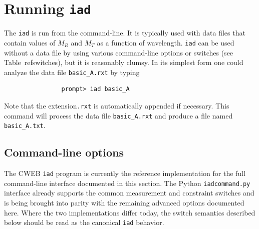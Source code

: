 \documentclass{article}
\newcommand\iadprog{\texttt{iad}}
\begin{document}
\clearpage
\section{Running \iadprog{}}

The \iadprog{} is run from the command-line.  It is typically used with
data files that contain values of $M_R$ and $M_T$ as a function of wavelength.
\iadprog{} can be used without a data file by using various command-line 
options or switches (see Table~ref{switches}), but it is reasonably clumsy.  
In its simplest form 
one could analyze the data file \texttt{basic\_A.rxt} by typing
\begin{verbatim}
                prompt> iad basic_A
\end{verbatim}
Note that the extension\texttt{.rxt} is automatically appended if necessary.
This command will process the data file \texttt{basic\_A.rxt} and produce a
file named \texttt{basic\_A.txt}.

\clearpage
\subsection{Command-line options}
The CWEB \texttt{iad} program is currently the reference implementation for the
full command-line interface documented in this section.  The Python
\texttt{iadcommand.py} interface already supports the common measurement and
constraint switches and is being brought into parity with the remaining
advanced options documented here.  Where the two implementations differ today,
the switch semantics described below should be read as the canonical \texttt{iad}
behavior.
\end{document}
